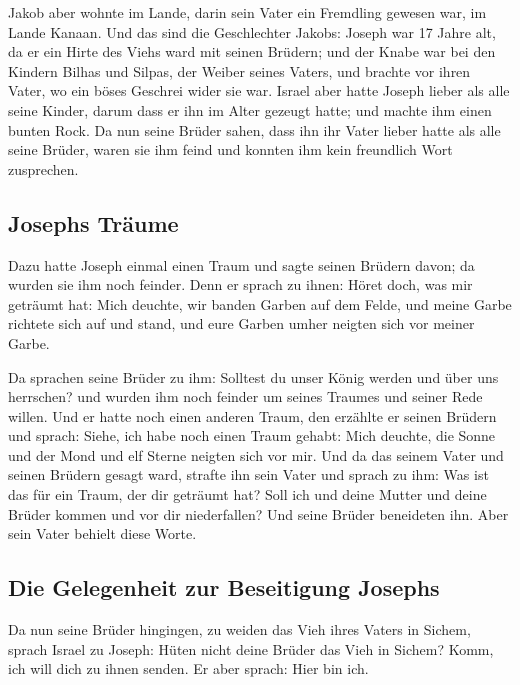  Jakob aber wohnte im Lande, darin sein Vater ein
Fremdling gewesen war, im Lande Kanaan.  Und das sind die
Geschlechter Jakobs: Joseph war 17 Jahre alt, da er ein Hirte des Viehs
ward mit seinen Brüdern; und der Knabe war bei den Kindern Bilhas und
Silpas, der Weiber seines Vaters, und brachte vor ihren Vater, wo ein
böses Geschrei wider sie war.  Israel aber hatte Joseph
lieber als alle seine Kinder, darum dass er ihn im Alter gezeugt hatte;
und machte ihm einen bunten Rock.  Da nun seine Brüder
sahen, dass ihn ihr Vater lieber hatte als alle seine Brüder, waren sie
ihm feind und konnten ihm kein freundlich Wort zusprechen.

\hypertarget{josephs-truxe4ume}{%
\subsection{Josephs Träume}\label{josephs-truxe4ume}}

 Dazu hatte Joseph einmal einen Traum und sagte seinen
Brüdern davon; da wurden sie ihm noch feinder.  Denn er
sprach zu ihnen: Höret doch, was mir geträumt hat:  Mich
deuchte, wir banden Garben auf dem Felde, und meine Garbe richtete sich
auf und stand, und eure Garben umher neigten sich vor meiner Garbe.

 Da sprachen seine Brüder zu ihm: Solltest du unser König
werden und über uns herrschen? und wurden ihm noch feinder um seines
Traumes und seiner Rede willen.  Und er hatte noch einen
anderen Traum, den erzählte er seinen Brüdern und sprach: Siehe, ich
habe noch einen Traum gehabt: Mich deuchte, die Sonne und der Mond und
elf Sterne neigten sich vor mir.  Und da das seinem Vater
und seinen Brüdern gesagt ward, strafte ihn sein Vater und sprach zu
ihm: Was ist das für ein Traum, der dir geträumt hat? Soll ich und deine
Mutter und deine Brüder kommen und vor dir niederfallen? 
Und seine Brüder beneideten ihn. Aber sein Vater behielt diese Worte.

\hypertarget{die-gelegenheit-zur-beseitigung-josephs}{%
\subsection{Die Gelegenheit zur Beseitigung
Josephs}\label{die-gelegenheit-zur-beseitigung-josephs}}

 Da nun seine Brüder hingingen, zu weiden das Vieh ihres
Vaters in Sichem,  sprach Israel zu Joseph: Hüten nicht
deine Brüder das Vieh in Sichem? Komm, ich will dich zu ihnen senden. Er
aber sprach: Hier bin ich.

